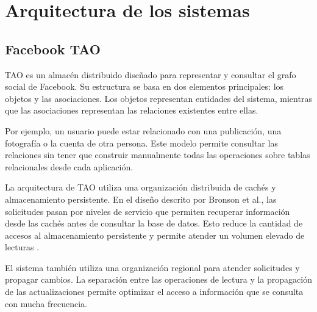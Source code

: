 \documentclass[12pt,a4paper]{article}
\begin{document}
\section{Arquitectura de los sistemas}

\subsection{Facebook TAO}

TAO es un almacén distribuido diseñado para representar y consultar el grafo social de Facebook. Su estructura se basa en dos elementos principales: los objetos y las asociaciones. Los objetos representan entidades del sistema, mientras que las asociaciones representan las relaciones existentes entre ellas.

Por ejemplo, un usuario puede estar relacionado con una publicación, una fotografía o la cuenta de otra persona. Este modelo permite consultar las relaciones sin tener que construir manualmente todas las operaciones sobre tablas relacionales desde cada aplicación.

La arquitectura de TAO utiliza una organización distribuida de cachés y almacenamiento persistente. En el diseño descrito por Bronson et al., las solicitudes pasan por niveles de servicio que permiten recuperar información desde las cachés antes de consultar la base de datos. Esto reduce la cantidad de accesos al almacenamiento persistente y permite atender un volumen elevado de lecturas \cite{bronson2013tao}.

El sistema también utiliza una organización regional para atender solicitudes y propagar cambios. La separación entre las operaciones de lectura y la propagación de las actualizaciones permite optimizar el acceso a información que se consulta con mucha frecuencia.
\end{document}
